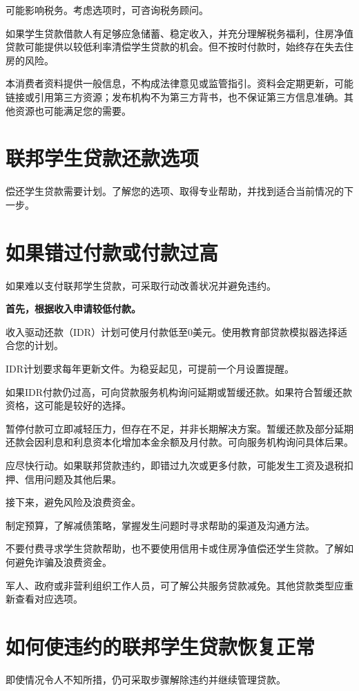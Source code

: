 \documentclass[UTF8,fontset=none,11pt,a4paper]{ctexart}
\begin{document}
可能影响税务。考虑选项时，可咨询税务顾问。


如果学生贷款借款人有足够应急储蓄、稳定收入，并充分理解税务福利，住房净值贷款可能提供以较低利率清偿学生贷款的机会。但不按时付款时，始终存在失去住房的风险。


本消费者资料提供一般信息，不构成法律意见或监管指引。资料会定期更新，可能链接或引用第三方资源；发布机构不为第三方背书，也不保证第三方信息准确。其他资源也可能满足您的需要。


\section*{联邦学生贷款还款选项}
偿还学生贷款需要计划。了解您的选项、取得专业帮助，并找到适合当前情况的下一步。


\section*{如果错过付款或付款过高}
如果难以支付联邦学生贷款，可采取行动改善状况并避免违约。


\textbf{首先，根据收入申请较低付款。}


收入驱动还款（IDR）计划可使月付款低至0美元。使用教育部贷款模拟器选择适合您的计划。


IDR计划要求每年更新文件。为稳妥起见，可提前一个月设置提醒。


如果IDR付款仍过高，可向贷款服务机构询问延期或暂缓还款。如果符合暂缓还款资格，这可能是较好的选择。


暂停付款可立即减轻压力，但存在不足，并非长期解决方案。暂缓还款及部分延期还款会因利息和利息资本化增加本金余额及月付款。可向服务机构询问具体后果。


应尽快行动。如果联邦贷款违约，即错过九次或更多付款，可能发生工资及退税扣押、信用问题及其他后果。


接下来，避免风险及浪费资金。


制定预算，了解减债策略，掌握发生问题时寻求帮助的渠道及沟通方法。


不要付费寻求学生贷款帮助，也不要使用信用卡或住房净值偿还学生贷款。了解如何避免诈骗及浪费资金。


军人、政府或非营利组织工作人员，可了解公共服务贷款减免。其他贷款类型应重新查看对应选项。


\section*{如何使违约的联邦学生贷款恢复正常}
即使情况令人不知所措，仍可采取步骤解除违约并继续管理贷款。
\end{document}
